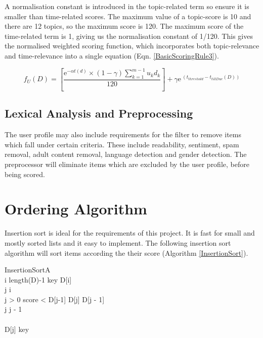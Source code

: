 A normalisation constant is introduced in the topic-related term so ensure it is smaller than time-related scores. The maximum value of a topic-score is 10 and there are 12 topics, so the maximum score is 120. The maximum score of the time-related term is 1, giving us the normalisation constant of 1/120.
This gives the normalised weighted scoring function, which incorporates both topic-relevance and time-relevance into a single equation (Eqn. \ref{BasicScoringRule3}).

\begin{equation}\label{BasicScoringRule3}
	f_U (D) = \left[\frac{{\mathrm{e}}^{-\alpha t(d)} \times (1-\gamma) \sum_{k=1}^{m-1} u_kd_k}{120} \right] + \gamma{\mathrm{e}}^{\ (t_{threshold}-t_{tillDue}(D))}
\end{equation}

\subsection{Lexical Analysis and Preprocessing}

The user profile may also include requirements for the filter to remove items which fall under certain criteria. These include readability, sentiment, spam removal, adult content removal, language detection and gender detection. The preprocessor will eliminate items which are excluded by the user profile, before being scored. 

\section{Ordering Algorithm}

Insertion sort is ideal for the requirements of this project. It is fast for small and mostly sorted lists and it easy to implement. The following insertion sort algorithm will sort items according the their score (Algorithm \ref{InsertionSort}).

\begin{pseudocode}{InsertionSort}{A}
	\label{InsertionSort}
	\\
	\FOR i \TO length(D)-1 \DO
	\BEGIN
		key \GETS D[i]\\
		j \GETS i\\
		\WHILE j > 0 \AND score < D[j-1] \DO
		\BEGIN
			D[j] \GETS D[j - 1]\\
			j \GETS j - 1\\
		\END \\
		D[j] \GETS key \\
	\END	
		
\end{pseudocode}


